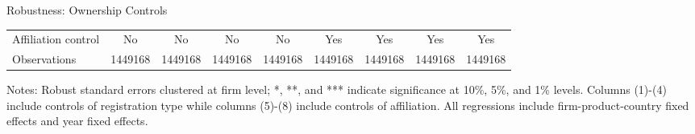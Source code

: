 \documentclass[10pt]{beamer}
\begin{document}
\begin{frame}{Robustness: Ownership Controls}
\begin{table}[htbp]
{\begin{threeparttable}
\begin{tabular}{lcccccccc}
			Affiliation control & No & No & No & No &  Yes  & Yes & Yes  & Yes \\
			Observations & 1449168 & 1449168 & 1449168 & 1449168 & 1449168 & 1449168 & 1449168 & 1449168\\
			\bottomrule
		\end{tabular}
		\begin{tablenotes}
			\footnotesize
			\item Notes: Robust standard errors clustered at firm level; *, **, and *** indicate significance at 10\%, 5\%, and 1\% levels. Columns (1)-(4) include controls of registration type while columns (5)-(8) include controls of affiliation. All regressions include firm-product-country fixed effects and year fixed effects.
		\end{tablenotes}
	\end{threeparttable}
        }
	\label{tab.robust.ownership}
    \end{table}
    \hyperlink{robustness_other}{}
\end{frame}
\end{document}
